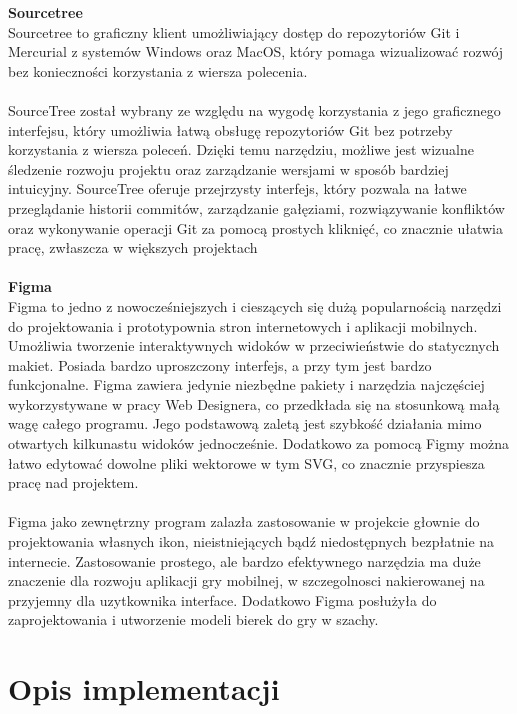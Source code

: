 \documentclass[12pt,a4paper]{article}
\begin{document}
\noindent \textbf{Sourcetree}\\
Sourcetree to graficzny klient umożliwiający dostęp do repozytoriów Git i Mercurial z systemów Windows oraz MacOS, który pomaga wizualizować rozwój bez konieczności korzystania z wiersza polecenia.
\\\\
SourceTree został wybrany ze względu na wygodę korzystania z jego graficznego interfejsu, który umożliwia łatwą obsługę repozytoriów Git bez potrzeby korzystania z wiersza poleceń. Dzięki temu narzędziu, możliwe jest wizualne śledzenie rozwoju projektu oraz zarządzanie wersjami w sposób bardziej intuicyjny. SourceTree oferuje przejrzysty interfejs, który pozwala na łatwe przeglądanie historii commitów, zarządzanie gałęziami, rozwiązywanie konfliktów oraz wykonywanie operacji Git za pomocą prostych kliknięć, co znacznie ułatwia pracę, zwłaszcza w większych projektach
\\\\

\noindent \textbf{Figma}\\
Figma to jedno z nowocześniejszych i cieszących się dużą popularnością narzędzi do projektowania i prototypownia stron internetowych i aplikacji mobilnych. Umożliwia tworzenie interaktywnych widoków w przeciwieństwie do statycznych makiet. Posiada bardzo uproszczony interfejs, a przy tym jest bardzo funkcjonalne. Figma zawiera jedynie niezbędne pakiety i narzędzia najczęściej wykorzystywane w pracy Web Designera, co przedkłada się na stosunkową małą wagę całego programu. Jego podstawową zaletą jest szybkość działania mimo otwartych kilkunastu widoków jednocześnie. Dodatkowo za pomocą Figmy można łatwo edytować dowolne pliki wektorowe w tym SVG, co znacznie przyspiesza pracę nad projektem.
\\\\
Figma jako zewnętrzny program zalazła zastosowanie w projekcie głownie do projektowania własnych ikon, nieistniejących bądź niedostępnych bezpłatnie na internecie. Zastosowanie prostego, ale bardzo efektywnego narzędzia ma duże znaczenie dla rozwoju aplikacji gry mobilnej, w szczegolnosci nakierowanej na przyjemny dla uzytkownika interface. Dodatkowo Figma posłużyła do zaprojektowania i utworzenie modeli bierek do gry w szachy.  

\newpage

\section{Opis implementacji}
\end{document}
